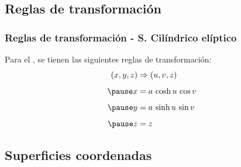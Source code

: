 \documentclass[12pt]{beamer}
\begin{document}
\subsection{Reglas de transformación}

\begin{frame}
\frametitle{Reglas de transformación - S. Cilíndrico elíptico}
Para el , se tienen las siguientes reglas de transformación:
\pause
\begin{eqnarray}
\begin{aligned}
(x, y, z) &\Rightarrow (u, v, z) \\[0.5em] \pause
x &= a \, \cosh u \, \cos v \\[0.5em] \pause
y &= a \, \sinh u \, \sin v \\[0.5em] \pause
z &= z
\end{aligned}
\label{eq:ecuacion_02_73_esp}
\end{eqnarray}
\end{frame}

\subsection{Superficies coordenadas}
\end{document}
